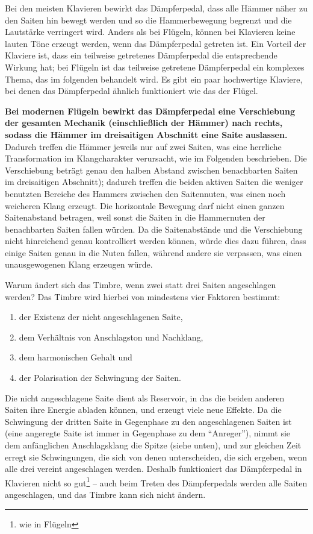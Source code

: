 Bei den meisten Klavieren bewirkt das Dämpferpedal, dass alle Hämmer näher zu den Saiten hin bewegt werden und so die Hammerbewegung begrenzt und die Lautstärke verringert wird.
Anders als bei Flügeln, können bei Klavieren keine lauten Töne erzeugt werden, wenn das Dämpferpedal getreten ist.
Ein Vorteil der Klaviere ist, dass ein teilweise getretenes Dämpferpedal die entsprechende Wirkung hat;
bei Flügeln ist das teilweise getretene Dämpferpedal ein komplexes Thema, das im folgenden behandelt wird.
Es gibt ein paar hochwertige Klaviere, bei denen das Dämpferpedal ähnlich funktioniert wie das der Flügel.

\textbf{Bei modernen Flügeln bewirkt das Dämpferpedal eine Verschiebung der gesamten Mechanik (einschließlich der Hämmer) nach rechts, sodass die Hämmer im dreisaitigen Abschnitt eine Saite auslassen.}
Dadurch treffen die Hämmer jeweils nur auf zwei Saiten, was eine herrliche Transformation im Klangcharakter verursacht, wie im Folgenden beschrieben.
Die Verschiebung beträgt genau den halben Abstand zwischen benachbarten Saiten im dreisaitigen Abschnitt);
dadurch treffen die beiden aktiven Saiten die weniger benutzten Bereiche des Hammers zwischen den Saitennuten, was einen noch weicheren Klang erzeugt.
Die horizontale Bewegung darf nicht einen ganzen Saitenabstand betragen, weil sonst die Saiten in die Hammernuten der benachbarten Saiten fallen würden.
Da die Saitenabstände und die Verschiebung nicht hinreichend genau kontrolliert werden können, würde dies dazu führen, dass einige Saiten genau in die Nuten fallen, während andere sie verpassen, was einen unausgewogenen Klang erzeugen würde.

Warum ändert sich das Timbre, wenn zwei statt drei Saiten angeschlagen werden?
Das Timbre wird hierbei von mindestens vier Faktoren bestimmt:

\begin{enumerate} 
 \item der Existenz der nicht angeschlagenen Saite,
 \item dem Verhältnis von Anschlagston und Nachklang,
 \item dem harmonischen Gehalt und
 \item der Polarisation der Schwingung der Saiten.
\end{enumerate}
Die nicht angeschlagene Saite dient als Reservoir, in das die beiden anderen Saiten ihre Energie abladen können, und erzeugt viele neue Effekte.
Da die Schwingung der dritten Saite in Gegenphase zu den angeschlagenen Saiten ist (eine angeregte Saite ist immer in Gegenphase zu dem \enquote{Anreger}), nimmt sie dem anfänglichen Anschlagsklang die Spitze (siehe unten), und zur gleichen Zeit erregt sie Schwingungen, die sich von denen unterscheiden, die sich ergeben, wenn alle drei vereint angeschlagen werden.
Deshalb funktioniert das Dämpferpedal in Klavieren nicht so gut\footnote{wie in Flügeln} -- auch beim Treten des Dämpferpedals werden alle Saiten angeschlagen, und das Timbre kann sich nicht ändern.

